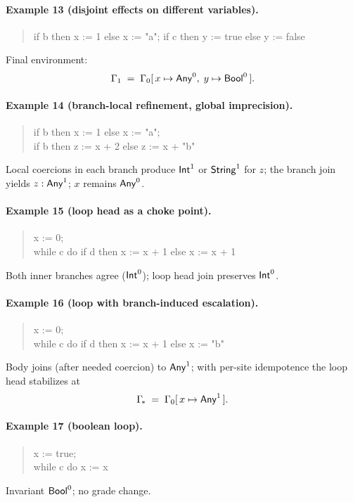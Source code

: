 \paragraph{Example 13 (disjoint effects on different variables).}
\begin{quote}\ttfamily
if b then x := 1 else x := "a";\quad
if c then y := true else y := false
\end{quote}
Final environment:
\[
\Gamma_1 \;=\; \Gamma_0[\,x \mapsto \mathsf{Any}^{0},\; y \mapsto \mathsf{Bool}^{0}\,].
\]

\paragraph{Example 14 (branch-local refinement, global imprecision).}
\begin{quote}\ttfamily
if b then x := 1 else x := "a";\\
if b then z := x + 2 else z := x + "b"
\end{quote}
Local coercions in each branch produce $\mathsf{Int}^{1}$ or $\mathsf{String}^{1}$ for $z$; the branch join yields $z:\mathsf{Any}^{1}$; $x$ remains $\mathsf{Any}^{0}$.

\paragraph{Example 15 (loop head as a choke point).}
\begin{quote}\ttfamily
x := 0;\\
while c do if d then x := x + 1 else x := x + 1
\end{quote}
Both inner branches agree ($\mathsf{Int}^{0}$); loop head join preserves $\mathsf{Int}^{0}$.

\paragraph{Example 16 (loop with branch-induced escalation).}
\begin{quote}\ttfamily
x := 0;\\
while c do if d then x := x + 1 else x := "b"
\end{quote}
Body joins (after needed coercion) to $\mathsf{Any}^{1}$; with per-site idempotence the loop head stabilizes at
\[
\Gamma_{\!*} \;=\; \Gamma_0[\,x \mapsto \mathsf{Any}^{1}\,].
\]

\paragraph{Example 17 (boolean loop).}
\begin{quote}\ttfamily
x := true;\\
while c do x := \neg x
\end{quote}
Invariant $\mathsf{Bool}^{0}$; no grade change.

